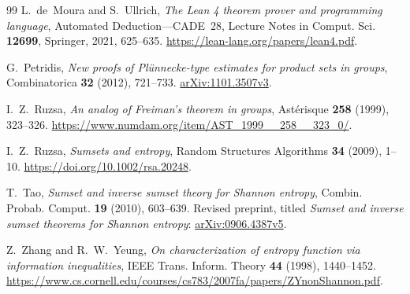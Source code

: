 \documentclass[11pt]{amsart}
\theoremstyle{definition}
\theoremstyle{remark}
\numberwithin{equation}{section}
\begin{document}
\begin{thebibliography}{99}
 L.~de~Moura and S.~Ullrich,
\emph{The Lean 4 theorem prover and programming language},
Automated Deduction---CADE~28, Lecture Notes in Comput. Sci. \textbf{12699},
Springer, 2021, 625--635.
\url{https://lean-lang.org/papers/lean4.pdf}.

 G.~Petridis,
\emph{New proofs of Pl\"unnecke-type estimates for product sets in groups},
Combinatorica \textbf{32} (2012), 721--733.
\href{https://arxiv.org/abs/1101.3507v3}{arXiv:1101.3507v3}.

 I.~Z.~Ruzsa, \emph{An analog of Freiman's theorem in groups},
Ast\'erisque \textbf{258} (1999), 323--326.
\url{https://www.numdam.org/item/AST_1999__258__323_0/}.

 I.~Z.~Ruzsa, \emph{Sumsets and entropy},
Random Structures Algorithms \textbf{34} (2009), 1--10.
\url{https://doi.org/10.1002/rsa.20248}.

 T.~Tao, \emph{Sumset and inverse sumset theory for Shannon entropy},
Combin. Probab. Comput. \textbf{19} (2010), 603--639.
Revised preprint, titled \emph{Sumset and inverse sumset theorems for Shannon entropy}:
\href{https://arxiv.org/abs/0906.4387v5}{arXiv:0906.4387v5}.

 Z.~Zhang and R.~W.~Yeung,
\emph{On characterization of entropy function via information inequalities},
IEEE Trans. Inform. Theory \textbf{44} (1998), 1440--1452.
\url{https://www.cs.cornell.edu/courses/cs783/2007fa/papers/ZYnonShannon.pdf}.

\end{thebibliography}
\end{document}
